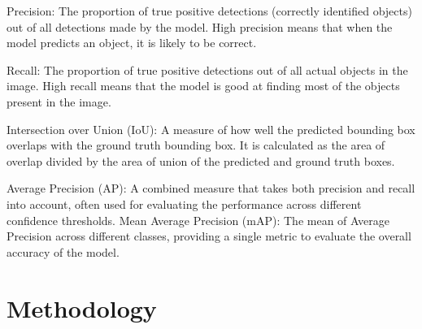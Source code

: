 Precision: The proportion of true positive detections (correctly identified objects) out of all detections made by the model. High precision means that when the model predicts an object, it is likely to be correct.

Recall: The proportion of true positive detections out of all actual objects in the image. High recall means that the model is good at finding most of the objects present in the image.

Intersection over Union (IoU): A measure of how well the predicted bounding box overlaps with the ground truth bounding box. It is calculated as the area of overlap divided by the area of union of the predicted and ground truth boxes.

Average Precision (AP): A combined measure that takes both precision and recall into account, often used for evaluating the performance across different confidence thresholds.
Mean Average Precision (mAP): The mean of Average Precision across different classes, providing a single metric to evaluate the overall accuracy of the model.

\section{Methodology}

